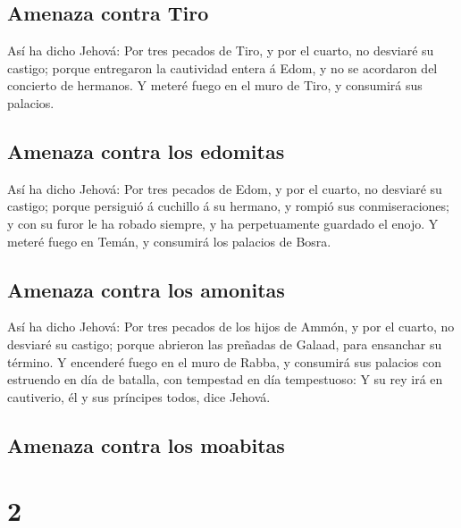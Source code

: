 \hypertarget{amenaza-contra-tiro}{%
\subsection{Amenaza contra Tiro}\label{amenaza-contra-tiro}}

 Así ha dicho Jehová: Por tres pecados de Tiro, y por el
cuarto, no desviaré su castigo; porque entregaron la cautividad entera á
Edom, y no se acordaron del concierto de hermanos.  Y
meteré fuego en el muro de Tiro, y consumirá sus palacios.

\hypertarget{amenaza-contra-los-edomitas}{%
\subsection{Amenaza contra los
edomitas}\label{amenaza-contra-los-edomitas}}

 Así ha dicho Jehová: Por tres pecados de Edom, y por el
cuarto, no desviaré su castigo; porque persiguió á cuchillo á su
hermano, y rompió sus conmiseraciones; y con su furor le ha robado
siempre, y ha perpetuamente guardado el enojo.  Y meteré
fuego en Temán, y consumirá los palacios de Bosra.

\hypertarget{amenaza-contra-los-amonitas}{%
\subsection{Amenaza contra los
amonitas}\label{amenaza-contra-los-amonitas}}

 Así ha dicho Jehová: Por tres pecados de los hijos de
Ammón, y por el cuarto, no desviaré su castigo; porque abrieron las
preñadas de Galaad, para ensanchar su término.  Y
encenderé fuego en el muro de Rabba, y consumirá sus palacios con
estruendo en día de batalla, con tempestad en día tempestuoso:
 Y su rey irá en cautiverio, él y sus príncipes todos,
dice Jehová.

\hypertarget{amenaza-contra-los-moabitas}{%
\subsection{Amenaza contra los
moabitas}\label{amenaza-contra-los-moabitas}}

\hypertarget{section-1}{%
\section{2}\label{section-1}}

